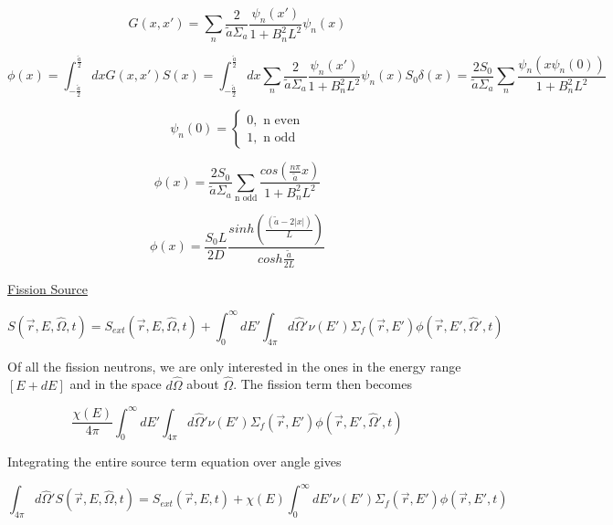 \documentclass[12pt]{article}
\newcommand{\rvec}{\ensuremath{\vec{r}}}
\newcommand{\omvec}{\ensuremath{\hat{\Omega}}}
\begin{document}
\begin{equation*}
G(x,x') = \sum_n \frac{2}{\tilde{a}\Sigma_a}\frac{\psi_n(x')}{1+B_n^2L^2}\psi_n(x)
\end{equation*}

\begin{equation*}
\phi(x) = \int_{-\tfrac{\tilde{a}}{2}}^{\tfrac{\tilde{a}}{2}}dxG(x,x')S(x) = 
\int_{-\tfrac{\tilde{a}}{2}}^{\tfrac{\tilde{a}}{2}}dx 
\sum_n \frac{2}{\tilde{a}\Sigma_a}\frac{\psi_n(x')}{1+B_n^2L^2}\psi_n(x) S_0 \delta(x)
= \frac{2S_0}{\tilde{a}\Sigma_a}\sum_n\frac{\psi_n(x\psi_n(0))}{1+B_n^2L^2}
\end{equation*}

\begin{equation*}
\psi_n(0) = 
	\begin{cases}
	0, \text{ n even} \\
	1, \text{ n odd}
	\end{cases}
\end{equation*}

\begin{equation*}
\phi(x)=\frac{2S_0}{\tilde{a}\Sigma_a}\sum_{\text{n odd}}\frac{cos(\tfrac{n\pi}{\tilde{a}}x)}{1+B_n^2L^2}
\end{equation*}

\begin{equation*}
\phi(x) = \frac{S_0L}{2D}\frac{sinh(\tfrac{(\tilde{a} - 2|x|)}{L})}{cosh\tfrac{\tilde{a}}{2L}}
\end{equation*}

\underline{Fission Source}

\begin{equation*}
S(\rvec,E,\omvec,t) = S_{ext}(\rvec,E,\omvec,t) + 
\int_0^{\infty}dE'\int_{4\pi}d\omvec' \nu(E')\Sigma_f(\rvec,E')\phi(\rvec,E',\omvec',t)
\end{equation*}

Of all the fission neutrons, we are only interested in the ones in the energy range $[E+dE]$ and in the
space $d\omvec$ about $\omvec$. The fission term then becomes

\begin{equation*}
\frac{\chi(E)}{4\pi}\int_0^{\infty}dE'
\int_{4\pi}d\omvec'\nu(E')\Sigma_f(\rvec,E')\phi(\rvec,E',\omvec',t)
\end{equation*}

Integrating the entire source term equation over angle gives

\begin{equation*}
\int_{4\pi}d\omvec'S(\rvec,E,\omvec,t) = S_{ext}(\rvec,E,t) + 
\chi(E)\int_0^{\infty}dE'\nu(E')\Sigma_f(\rvec,E')\phi(\rvec,E',t)
\end{equation*}
\end{document}
